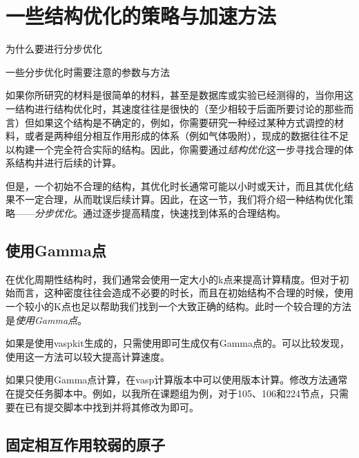 \section{一些结构优化的策略与加速方法}\label{sec:一些结构优化的策略与加速方法}

\begin{Abstract}
    \item 为什么要进行分步优化
    \item 一些分步优化时需要注意的参数与方法
\end{Abstract}

如果你所研究的材料是很简单的材料，甚至是数据库或实验已经测得的，当你用这一结构进行结构优化时，其速度往往是很快的（至少相较于后面所要讨论的那些而言）但如果这个结构是不确定的，例如，你需要研究一种经过某种方式调控的材料，或者是两种组分相互作用形成的体系（例如气体吸附），现成的数据往往不足以构建一个完全符合实际的结构。因此，你需要通过\emph{结构优化}这一步寻找合理的体系结构并进行后续的计算。

但是，一个初始不合理的结构，其优化时长通常可能以小时或天计，而且其优化结果不一定合理，从而耽误后续计算。因此，在这一节，我们将介绍一种结构优化策略——\emph{分步优化}。通过逐步提高精度，快速找到体系的合理结构。

\subsection{使用Gamma点}\label{subsec:一些结构优化的策略与加速方法-使用Gamma点}

在优化周期性结构时，我们通常会使用一定大小的k点来提高计算精度。但对于初始而言，这种密度往往会造成不必要的时长，而且在初始结构不合理的时候，使用一个较小的K点也足以帮助我们找到一个大致正确的结构。此时一个较合理的方法是\emph{使用Gamma点}。

如果是使用vaspkit生成的，只需使用即可生成仅有Gamma点的。可以比较发现，使用这一方法可以较大提高计算速度。

\begin{extend}
    如果只使用Gamma点计算，在vasp计算版本中可以使用版本计算。修改方法通常在提交任务脚本中。例如，以我所在课题组为例，对于105、106和224节点，只需要在已有提交脚本中找到并将其修改为即可。
\end{extend}

\subsection{固定相互作用较弱的原子}\label{subsec:一些结构优化的策略与加速方法-固定相互作用较弱的原子}

